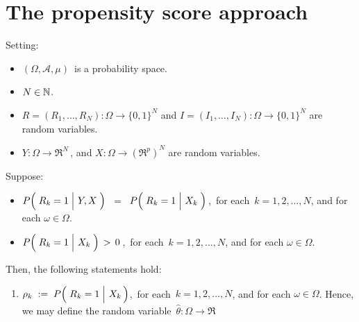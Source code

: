 

\section{The propensity score approach}
\setcounter{theorem}{0}
\setcounter{equation}{0}


\renewcommand{\theenumi}{\roman{enumi}}
\renewcommand{\labelenumi}{\textnormal{(\theenumi)}$\;\;$}



\begin{proposition}
\mbox{}
\vskip 0.1cm
\noindent
Setting:
\begin{itemize}
\item
	$(\Omega,\mathcal{A},\mu)$\, is a probability space.
\item
	$N \in \mathbb{N}$.
\item
	$R = (R_{1},\ldots,R_{N}): \Omega \longrightarrow \{0,1\}^{N}$\; and
	$I  = (I_{1},\ldots,I_{N}): \Omega \longrightarrow \{0,1\}^{N}$
	are random variables.
\item
	$Y : \Omega \longrightarrow \Re^{N}$\,,\; and\;
	$X : \Omega \longrightarrow (\Re^{p})^{N}$
	are random variables.
\end{itemize}
Suppose:
\begin{itemize}
\item
	$P\!\left(\,\left.\overset{{\color{white}.}}{R}_{k}=1\;\right\vert\,Y,X\;\right)$
	\,$=$\,
	$P\!\left(\,\left.\overset{{\color{white}.}}{R}_{k}=1\;\right\vert\,X_{k}\;\right)$\,,\,
	for each \,$k = 1, 2, \ldots, N$, and for each $\omega \in \Omega$.
\item
	$P\!\left(\,\left.\overset{{\color{white}.}}{R}_{k}=1\;\right\vert\,X_{k}\;\right) \, > \, 0$\,,\,
	for each \,$k = 1, 2, \ldots, N$, and for each $\omega \in \Omega$.
\end{itemize}
\vskip 0.3cm
\noindent
Then, the following statements hold:
\begin{enumerate}
\item
	$\rho_{k} \; := \; P\!\left(\,\left.\overset{{\color{white}.}}{R}_{k}=1\;\right\vert\,X_{k}\,\right)$,\,
	for each \,$k = 1, 2, \ldots, N$, and for each $\omega \in \Omega$.
	\vskip 0.05cm
	\noindent
	Hence, we may define the random variable
	\,$\widehat{\theta} : \Omega \longrightarrow \Re$\,

\end{enumerate}
\end{proposition}
